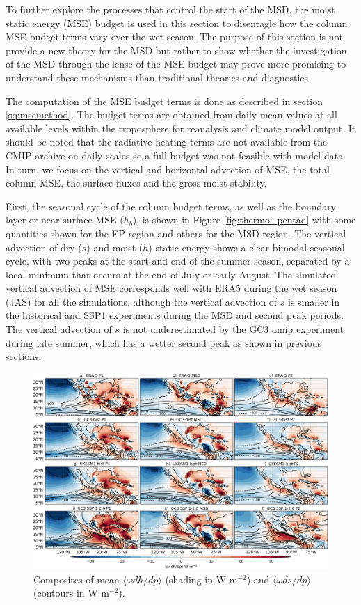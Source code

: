 To further explore the processes that control the start of the MSD, the moist static energy (MSE) budget is used in this section to disentagle how the column MSE budget terms vary over the wet season. The purpose of this section is not provide a new theory for the MSD but rather to show whether the investigation of the MSD through the lense of the MSE budget may prove more promising to understand these mechanisms than traditional theories and diagnostics. 


 The computation of the MSE budget terms is done as described in section \ref{sq:msemethod}. The budget terms are obtained from daily-mean values at all available levels within the troposphere for reanalysis and climate model output. It should be noted that the radiative heating terms are not available from the CMIP archive on daily scales so a full budget was not feasible with model data. In turn, we focus on the vertical and horizontal advection of MSE, the total column MSE, the surface fluxes and the gross moist stability.
 
  First, the seasonal cycle of the column budget terms, as well as the boundary layer or near surface MSE ($h_b$), is shown in Figure \ref{fig:thermo_pentad} with some quantities shown for the EP region and others for the MSD region. The vertical advection of dry ($s$) and moist ($h$) static energy shows a clear bimodal seasonal cycle, with two peaks at the start and end of the summer season, separated by a local minimum that occurs at the end of July or early August.
 The simulated vertical advection of MSE corresponds well with ERA5 during the wet season (JAS) for all the simulations, although the vertical advection of $s$ is smaller in the historical and SSP1 experiments during the MSD and second peak periods. The vertical advection of $s$ is not underestimated by the GC3 amip experiment during late summer, which has a wetter second peak as shown in previous sections. 

\begin{figure}[t!]
\includegraphics[width=\linewidth]{figures/thermocompositewdhdp.png}
\caption[Composites of the mean vertical advection of the MSE budget]{Composites of mean $\langle \omega dh/dp \rangle$ (shading in W m$^{-2}$) and $\langle \omega ds/dp \rangle$ (contours in W m$^{-2}$).  }
\label{fig:wdhdpcompo}
\end{figure}  
 
